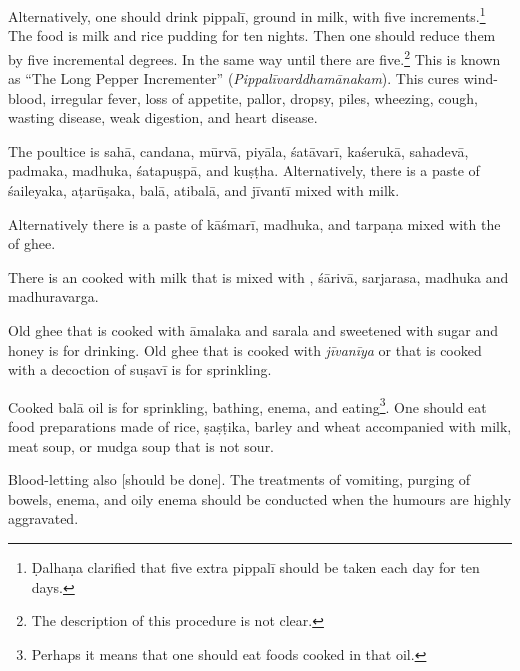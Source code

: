 \begin{translation}
Alternatively, one should drink \gls{pippalī}, ground in milk, with
five increments.\footnote{Ḍalhaṇa clarified that five extra
    \gls{pippalī} should be taken each day for ten days.} The food is milk
    and rice pudding for ten nights. Then one should reduce them by five
    incremental degrees.  In the same way until there are
    five.\footnote{The description of this procedure is not clear.} This
        is known as “The Long Pepper Incrementer”
        (\emph{Pippalīvarddhamānakam}). This cures wind-blood, irregular
        fever, loss of appetite, pallor, dropsy, piles, wheezing, cough,
        wasting disease, weak digestion, and heart disease.
        
The poultice is  \gls{sahā}, \gls{candana}, \gls{mūrvā}, \gls{piyāla},
\gls{śatāvarī}, \gls{kaśerukā}, \gls{sahadevā}, \gls{padmaka},
\gls{madhuka}, \gls{śatapuṣpā}, and \gls{kuṣṭha}. Alternatively, there
is a paste of \gls{śaileyaka}, \gls{aṭarūṣaka}, \gls{balā},
\gls{atibalā}, and \gls{jīvantī} mixed with milk.

Alternatively there is a paste of \gls{kāśmarī}, \gls{madhuka}, and \gls{tarpaṇa} mixed with the  of ghee. 

There is an  cooked with milk that is
mixed with , \gls{śārivā}, \gls{sarjarasa},
\gls{madhuka} and \gls{madhuravarga}.

 
 \begin{tt}
     \raggedright
     \bigskip
     



Old ghee that is cooked with \gls{āmalaka} and \gls{sarala} and
sweetened with sugar and honey is for drinking. Old ghee that is
cooked with \textit{jīvanīya} or that is cooked with a decoction of
\gls{suṣavī} is for sprinkling.
            
Cooked \gls{balā} oil is for sprinkling, bathing, enema, and
eating\footnote{Perhaps it means that one should eat foods cooked in
    that oil.}. One should eat food preparations made of rice,
    \gls{ṣaṣṭika}, barley and wheat accompanied with milk, meat soup, or
    \gls{mudga} soup that is not sour.
                
Blood-letting also [should be done]. The treatments of vomiting,
purging of bowels, enema, and oily enema should be conducted when the
humours are highly aggravated.

\item[13]



\end{tt}
\end{translation}
